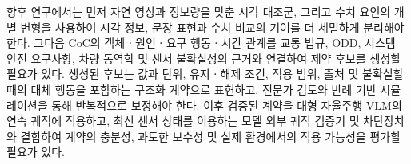 향후 연구에서는 먼저 자연 영상과 정보량을 맞춘 시각 대조군, 그리고 수치 요인의 개별 변형을 사용하여 시각 정보, 문장 표현과 수치 비교의 기여를 더 세밀하게 분리해야 한다. 그다음 CoC의 객체ㆍ원인ㆍ요구 행동ㆍ시간 관계를 교통 법규, ODD, 시스템 안전 요구사항, 차량 동역학 및 센서 불확실성의 근거와 연결하여 제약 후보를 생성할 필요가 있다. 생성된 후보는 값과 단위, 유지ㆍ해제 조건, 적용 범위, 출처 및 불확실할 때의 대체 행동을 포함하는 구조화 계약으로 표현하고, 전문가 검토와 반례 기반 시뮬레이션을 통해 반복적으로 보정해야 한다. 이후 검증된 계약을 대형 자율주행 VLM의 연속 궤적에 적용하고, 최신 센서 상태를 이용하는 모델 외부 궤적 검증기 및 차단장치와 결합하여 계약의 충분성, 과도한 보수성 및 실제 환경에서의 적용 가능성을 평가할 필요가 있다.
